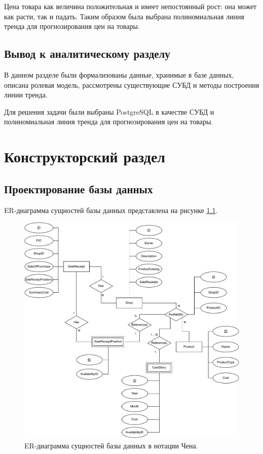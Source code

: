 \documentclass[a4paper,14pt]{extreport}
\begin{document}
Цена товара как величина положительная и имеет непостоянный рост: она может как расти, так и падать. Таким образом была выбрана полиномиальная линия тренда для прогнозирования цен на товары.

\section*{Вывод к аналитическому разделу}

В данном разделе были формализованы данные, хранимые в базе данных, описана ролевая модель, рассмотрены существующие СУБД и методы построения линии тренда.

Для решения задачи были выбраны PostgreSQL в качестве СУБД и полиномиальная линия тренда для прогнозирования цен на товары.

\chapter{Конструкторский раздел}

\section{Проектирование базы данных}

ER-диаграмма сущностей базы данных представлена на рисунке \ref{db_proj}.

\captionsetup{singlelinecheck = false, justification=centering}
\begin{figure}[H]
	\centering
	\includegraphics[scale=0.8]{ER.drawio.pdf}
	\caption{ER-диаграмма сущностей базы данных в нотации Чена.}
	\label{db_proj}
\end{figure}
\end{document}
